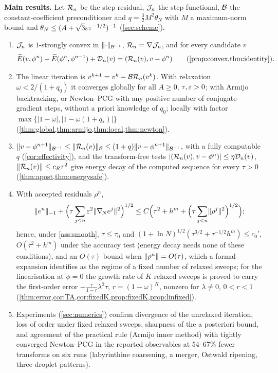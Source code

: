 \medskip\noindent\textbf{Main results.} Let $\mathcal{R}_n$ be the step residual, $\mathcal{J}_n$ the step functional, $\mathcal{B}$ the constant-coefficient preconditioner and $q=\frac32M^2\theta_N$ with $M$ a maximum-norm bound and $\theta_N\le(A+\sqrt3\varepsilon\tau^{-1/2})^{-1}$ (\cref{sec:scheme}).
\begin{enumerate}
\item $\mathcal{J}_n$ is $1$-strongly convex in $\lVert \cdot\rVert_{\mathcal{B}^{-1}}$, $\mathcal{R}_n=\nabla\mathcal{J}_n$, and for every candidate $v$
\[
\Et(v,\phi^n)-\Et(\phi^n,\phi^{n-1})+\Dn(v)=\ip{\Rn(v)}{v-\phi^n}\qquad(\text{\cref{prop:convex,thm:identity}}).
\]
\item The linear iteration is $v^{k+1}=v^k-\mathcal{B}\mathcal{R}_n(v^k)$. With relaxation $\omega<2/(1+q_0)$ it converges globally for all $A\ge0$, $\tau,\varepsilon>0$; with Armijo backtracking, or Newton--PCG with any positive number of conjugate-gradient steps, without a priori knowledge of $q_0$; locally with factor $\max\{|1-\omega|,|1-\omega(1+q_*)|\}$ (\cref{thm:global,thm:armijo,thm:local,thm:newton}).
\item $\lVert v-\phi^{n+1}\rVert_{\mathcal{B}^{-1}}\le\lVert \mathcal{R}_n(v)\rVert_{\mathcal{B}}\le(1+q)\lVert v-\phi^{n+1}\rVert_{\mathcal{B}^{-1}}$, with a fully computable $q$ (\cref{cor:effectivity}), and the transform-free tests $|(\mathcal{R}_n(v),v-\phi^n)|\le\eta\mathcal{D}_n(v)$, $\lVert \mathcal{R}_n(v)\rVert\le c_R\tau^2$ give energy decay of the computed sequence for every $\tau>0$ (\cref{thm:apost,thm:energysafe}).
\item With accepted residuals $\rho^n$,
\[
\lVert e^n\rVert_{-1}+\Big(\tau\sum_{j\le n}\varepsilon^2\lVert \nabla_{\!N} e^j\rVert^2\Big)^{1/2}\le C\Big(\tau^2+h^m+\Big(\tau\sum_{j<n}\lVert \rho^j\rVert^2\Big)^{1/2}\Big);
\] hence, under \cref{ass:smooth}, $\tau\le\tau_0$ and $(1+\ln N)^{1/2}(\tau^{3/2}+\tau^{-1/2}h^m)\le c_0'$, $O(\tau^2+h^m)$ under the accuracy test (energy decay needs none of these conditions), and an $O(\tau)$ bound when $\lVert \rho^n\rVert=O(\tau)$, which a formal expansion identifies as the regime of a fixed number of relaxed sweeps; for the linearisation at $\phi=0$ the growth rate of $K$ relaxed sweeps is proved to carry the first-order error $-\frac{r}{1-r}\lambda^2\tau$, $r=(1-\omega)^K$, nonzero for $\lambda\ne0$, $0<r<1$ (\cref{thm:error,cor:TA,cor:fixedK,prop:fixedK,prop:linfixed}).
\item Experiments (\cref{sec:numerics}) confirm divergence of the unrelaxed iteration, loss of order under fixed relaxed sweeps, sharpness of the a posteriori bound, and agreement of the practical rule (Armijo inner method) with tightly converged Newton--PCG in the reported observables at $54$--$67\%$ fewer transforms on six runs (labyrinthine coarsening, a merger, Ostwald ripening, three droplet patterns).
\end{enumerate}
